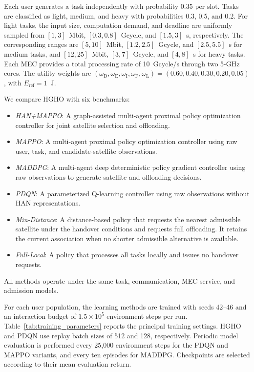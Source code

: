 \documentclass[journal]{IEEEtran}
\begin{document}
Each user generates a task independently with probability
0.35 per slot. Tasks are classified as light, medium,
and heavy with probabilities 0.3, 0.5, and 0.2.
For light tasks, the input size, computation demand,
and deadline are uniformly sampled from
$[1,3]$~Mbit, $[0.3,0.8]$~Gcycle, and $[1.5,3]$~s,
respectively. The corresponding ranges are
$[5,10]$~Mbit, $[1.2,2.5]$~Gcycle, and $[2.5,5.5]$~s
for medium tasks, and
$[12,25]$~Mbit, $[3,7]$~Gcycle, and $[4,8]$~s
for heavy tasks.
Each MEC provides a total processing rate of
10~Gcycle/s through two 5-GHz cores.
The utility weights are
$(\omega_{\mathrm D},\omega_{\mathrm E},
\omega_{\mathrm I},\omega_{\mathrm F},\omega_{\mathrm L})
=(0.60,0.40,0.30,0.20,0.05)$,
with $E_{\mathrm{ref}}=1$~J.

We compare HGHO with six benchmarks:
\begin{itemize}
    \item \textit{HAN+MAPPO}: A graph-assisted multi-agent
    proximal policy optimization controller for joint
    satellite selection and offloading.

    \item \textit{MAPPO}: A multi-agent proximal policy
    optimization controller using raw user, task, and
    candidate-satellite observations.

    \item \textit{MADDPG}: A multi-agent deep deterministic
    policy gradient controller using raw observations
    to generate satellite and offloading decisions.

    \item \textit{PDQN}: A parameterized Q-learning
    controller using raw observations without HAN
    representations.

    \item \textit{Min-Distance}: A distance-based policy
    that requests the nearest admissible satellite
    under the handover conditions and requests full
    offloading. It retains the current association
    when no shorter admissible alternative is available.

    \item \textit{Full-Local}: A policy that processes
    all tasks locally and issues no handover requests.
\end{itemize}
All methods operate under the same task, communication,
MEC service, and admission models.

For each user population, the learning methods are trained
with seeds 42--46 and an interaction budget of
$1.5\times10^5$ environment steps per run.
Table~\ref{tab:training_parameters} reports the principal
training settings.
HGHO and PDQN use replay batch sizes of 512 and 128,
respectively. Periodic model evaluation is performed
every 25,000 environment steps for the PDQN and MAPPO
variants, and every ten episodes for MADDPG.
Checkpoints are selected according to their mean
evaluation return.
\end{document}
